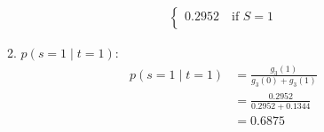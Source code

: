 \begin{example}
\begin{enumerate}
\begin{enumerate}
\begin{align*}
\begin{cases}
                    0.2952 \quad \text{if } S=1 \\
                \end{cases} 
            \end{align*}
            \item $p(s=1 \mid t=1)$: 
            \begin{align*}
                p(s=1 \mid t=1) &= \frac{g_3(1)}{g_3(0) + g_3(1)} \\
                &= \frac{0.2952}{0.2952 + 0.1344} \\
                &= 0.6875
            \end{align*}
        \end{enumerate}
    \end{enumerate}


\end{example}
